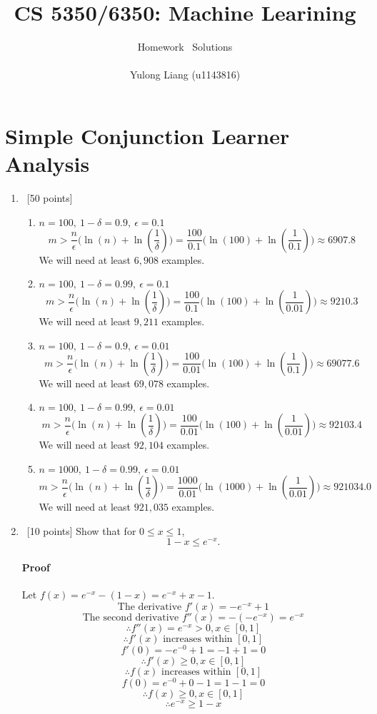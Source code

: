 \documentclass[12pt, fullpage,letterpaper]{article}
\title{CS 5350/6350: Machine Learining \semester}
\author{Homework \assignmentId\ Solutions\\\\Yulong Liang (u1143816)}
\begin{document}
\maketitle

\section{Simple Conjunction Learner Analysis}

\begin{enumerate}
\item~[50 points]
\begin{enumerate}
\item $n=100,\ 1-\delta=0.9,\ \epsilon=0.1$\\
$$m>\frac{n}{\epsilon}\Big(\ln(n)+\ln(\frac{1}{\delta})\Big)=\frac{100}{0.1}\Big(\ln(100)+\ln(\frac{1}{0.1})\Big)\approx6907.8$$
We will need at least $6,908$ examples.
\item $n=100,\ 1-\delta=0.99,\ \epsilon=0.1$\\
$$m>\frac{n}{\epsilon}\Big(\ln(n)+\ln(\frac{1}{\delta})\Big)=\frac{100}{0.1}\Big(\ln(100)+\ln(\frac{1}{0.01})\Big)\approx9210.3$$
We will need at least $9,211$ examples.
\item $n=100,\ 1-\delta=0.9,\ \epsilon=0.01$\\
$$m>\frac{n}{\epsilon}\Big(\ln(n)+\ln(\frac{1}{\delta})\Big)=\frac{100}{0.01}\Big(\ln(100)+\ln(\frac{1}{0.1})\Big)\approx69077.6$$
We will need at least $69,078$ examples.
\item $n=100,\ 1-\delta=0.99,\ \epsilon=0.01$\\
$$m>\frac{n}{\epsilon}\Big(\ln(n)+\ln(\frac{1}{\delta})\Big)=\frac{100}{0.01}\Big(\ln(100)+\ln(\frac{1}{0.01})\Big)\approx92103.4$$
We will need at least $92,104$ examples.
\item $n=1000,\ 1-\delta=0.99,\ \epsilon=0.01$\\
$$m>\frac{n}{\epsilon}\Big(\ln(n)+\ln(\frac{1}{\delta})\Big)=\frac{1000}{0.01}\Big(\ln(1000)+\ln(\frac{1}{0.01})\Big)\approx921034.0$$
We will need at least $921,035$ examples.
\end{enumerate}
\item~[10 points] Show that for $0\le x \le 1$, 
\[1 - x \le e^{-x}.\]
\paragraph{Proof}Let $f(x)=e^{-x}-(1-x)=e^{-x}+x-1$.
$$\text{The derivative } f'(x)=-e^{-x}+1$$
$$\text{The second derivative } f''(x)=-(-e^{-x})=e^{-x}$$
$$\therefore f''(x)=e^{-x}>0, x\in[0,1]$$
$$\therefore f'(x) \text{ increases within } [0,1]$$
$$f'(0)=-e^{-0}+1=-1+1=0$$
$$\therefore f'(x)\ge0, x\in[0,1]$$
$$\therefore f(x) \text{ increases within } [0,1]$$
$$f(0)=e^{-0}+0-1=1-1=0$$
$$\therefore f(x)\ge0, x\in[0,1]$$
$$\therefore e^{-x}\ge1-x$$
\end{enumerate}
\end{document}

